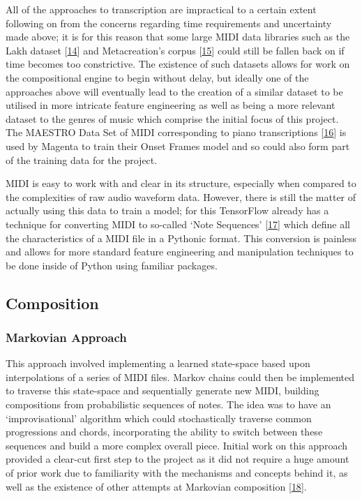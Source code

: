 \documentclass[12pt,]{article}
\begin{document}
All of the approaches to transcription are impractical to a certain
extent following on from the concerns regarding time requirements and
uncertainty made above; it is for this reason that some large MIDI data
libraries such as the Lakh dataset
{[}\protect\hyperlink{ref-lakh}{14}{]} and Metacreation's corpus
{[}\protect\hyperlink{ref-metacreation}{15}{]} could still be fallen
back on if time becomes too constrictive. The existence of such datasets
allows for work on the compositional engine to begin without delay, but
ideally one of the approaches above will eventually lead to the creation
of a similar dataset to be utilised in more intricate feature
engineering as well as being a more relevant dataset to the genres of
music which comprise the initial focus of this project. The MAESTRO Data
Set of MIDI corresponding to piano transcriptions
{[}\protect\hyperlink{ref-maestro2018}{16}{]} is used by Magenta to
train their Onset Frames model and so could also form part of the
training data for the project.

MIDI is easy to work with and clear in its structure, especially when
compared to the complexities of raw audio waveform data. However, there
is still the matter of actually using this data to train a model; for
this TensorFlow already has a technique for converting MIDI to so-called
`Note Sequences' {[}\protect\hyperlink{ref-notesequences}{17}{]} which
define all the characteristics of a MIDI file in a Pythonic format. This
conversion is painless and allows for more standard feature engineering
and manipulation techniques to be done inside of Python using familiar
packages.

\hypertarget{composition}{%
\subsection{Composition}\label{composition}}

\hypertarget{markovian-approach}{%
\subsubsection{Markovian Approach}\label{markovian-approach}}

This approach involved implementing a learned state-space based upon
interpolations of a series of MIDI files. Markov chains could then be
implemented to traverse this state-space and sequentially generate new
MIDI, building compositions from probabilistic sequences of notes. The
idea was to have an `improvisational' algorithm which could
stochastically traverse common progressions and chords, incorporating
the ability to switch between these sequences and build a more complex
overall piece. Initial work on this approach provided a clear-cut first
step to the project as it did not require a huge amount of prior work
due to familiarity with the mechanisms and concepts behind it, as well
as the existence of other attempts at Markovian composition
{[}\protect\hyperlink{ref-markovcomposer}{18}{]}.
\end{document}
